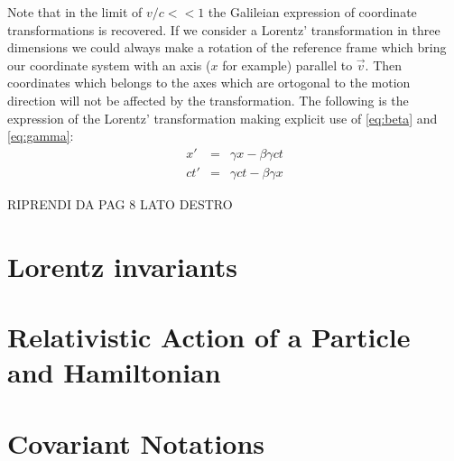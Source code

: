 Note that in the limit of $v/c << 1$ the Galileian expression of coordinate transformations is recovered. If we consider a Lorentz' transformation in three dimensions we could always make a rotation of the reference frame which bring our coordinate system with an axis ($x$ for example) parallel to $\vec{v}$. Then coordinates which belongs to the axes which are ortogonal to the motion direction will not be affected by the transformation. The following is the expression of the Lorentz' transformation making explicit use of \ref{eq:beta} and \ref{eq:gamma}:
\begin{eqnarray}
  x' &=& \gamma x -\beta\gamma c t \\
  ct' &=& \gamma ct -\beta\gamma x
\end{eqnarray}

RIPRENDI DA PAG 8 LATO DESTRO
\section{Lorentz invariants} 
\section{Relativistic Action of a Particle and Hamiltonian}
\section{Covariant Notations}

